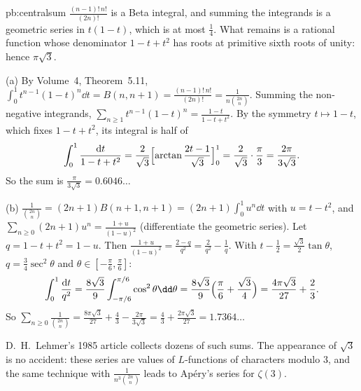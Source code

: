 \begin{solution}{pb:centralsum}
\idea $\frac{(n-1)!\,n!}{(2n)!}$ is a Beta integral, and summing the integrands is a geometric series in $t(1-t)$, which is at most
$\frac14$. What remains is a rational function whose denominator $1-t+t^2$ has roots at primitive sixth roots of unity: hence $\pi\sqrt3$.

\writeup (a) By Volume~4, Theorem~5.11, $\int_0^1t^{n-1}(1-t)^n\dd t=B(n,n+1)=\frac{(n-1)!\,n!}{(2n)!}=\frac1{n\binom{2n}n}$. Summing the non-negative
integrands, $\sum_{n\ge1}t^{n-1}(1-t)^n=\frac{1-t}{1-t+t^2}$. By the symmetry $t\mapsto1-t$, which fixes $1-t+t^2$, its integral is half of
\[
\int_0^1\frac{\mathrm dt}{1-t+t^2}=\frac2{\sqrt3}\Bigl[\arctan\frac{2t-1}{\sqrt3}\Bigr]_0^1=\frac2{\sqrt3}\cdot\frac\pi3=\frac{2\pi}{3\sqrt3}.
\]
So the sum is $\frac\pi{3\sqrt3}=0.6046\ldots$

(b) $\frac1{\binom{2n}n}=(2n+1)B(n+1,n+1)=(2n+1)\int_0^1u^n\dd t$ with $u=t-t^2$, and $\sum_{n\ge0}(2n+1)u^n=\frac{1+u}{(1-u)^2}$ (differentiate the geometric
series). Let $q=1-t+t^2=1-u$. Then $\frac{1+u}{(1-u)^2}=\frac{2-q}{q^2}=\frac2{q^2}-\frac1q$. With $t-\frac12=\frac{\sqrt3}2\tan\theta$, $q=\frac34\sec^2\theta$ and
$\theta\in[-\frac\pi6,\frac\pi6]$:
\[
\int_0^1\frac{\mathrm dt}{q^2}=\frac{8\sqrt3}9\int_{-\pi/6}^{\pi/6}\cos^2\theta\dd\theta=\frac{8\sqrt3}9\Bigl(\frac\pi6+\frac{\sqrt3}4\Bigr)=\frac{4\pi\sqrt3}{27}+\frac23.
\]
So $\sum_{n\ge0}\frac1{\binom{2n}n}=\frac{8\pi\sqrt3}{27}+\frac43-\frac{2\pi}{3\sqrt3}=\frac43+\frac{2\pi\sqrt3}{27}=1.7364\ldots$

\leads D.~H.~Lehmer's 1985 article collects dozens of such sums. The appearance of $\sqrt3$ is no accident: these series are values
of $L$-functions of characters modulo $3$, and the same technique with $\frac1{n^3\binom{2n}n}$ leads to Apéry's series for $\zeta(3)$.
\end{solution}

